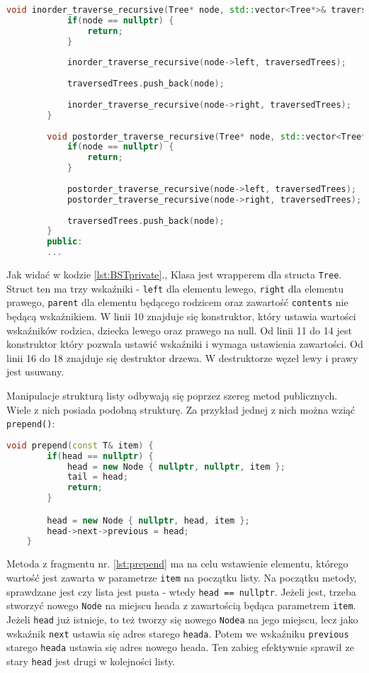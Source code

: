 \begin{lstlisting}[caption=Deklaracja drzewa BST, label={lst:BSTprivate}, language=C++]
		void inorder_traverse_recursive(Tree* node, std::vector<Tree*>& traversedTrees) {
			if(node == nullptr) {
				return;
			}
			
			inorder_traverse_recursive(node->left, traversedTrees);
			
			traversedTrees.push_back(node);
			
			inorder_traverse_recursive(node->right, traversedTrees);
		}
		
		void postorder_traverse_recursive(Tree* node, std::vector<Tree*>& traversedTrees) {
			if(node == nullptr) {
				return;
			}
			
			postorder_traverse_recursive(node->left, traversedTrees);
			postorder_traverse_recursive(node->right, traversedTrees);
			
			traversedTrees.push_back(node);
		}
		public:
		...
\end{lstlisting}

Jak widać w kodzie \ref{lst:BSTprivate}., Klasa jest wrapperem dla structa \texttt{Tree}. Struct ten ma trzy wskaźniki - \texttt{left} dla elementu lewego, \texttt{right} dla elementu prawego, \texttt{parent} dla elementu będącego rodzicem oraz zawartość \texttt{contents} nie będącą wskaźnikiem. W linii 10 znajduje się konstruktor, który ustawia wartości wskaźników rodzica, dziecka lewego oraz prawego na null.
Od linii 11 do 14 jest konstruktor który pozwala ustawić wskaźniki i wymaga ustawienia zawartości.
Od linii 16 do 18 znajduje się destruktor drzewa. W destruktorze węzeł lewy i prawy jest usuwany.

Manipulacje strukturą listy odbywają się poprzez szereg metod publicznych. Wiele z nich posiada podobną strukturę. Za przykład jednej z nich można wziąć \texttt{prepend()}:

\begin{lstlisting}[caption = Kod \texttt{prepend()}, label={lst:prepend}, language=C++]
	void prepend(const T& item) {
		if(head == nullptr) {
			head = new Node { nullptr, nullptr, item };	
			tail = head;
			return;
		}

		head = new Node { nullptr, head, item };
		head->next->previous = head;
	}
\end{lstlisting}

Metoda z fragmentu nr. \ref{lst:prepend} ma na celu wstawienie elementu, którego wartość jest zawarta w parametrze \texttt{item} na początku listy. Na początku metody, sprawdzane jest czy lista jest pusta - wtedy \texttt{head == nullptr}. Jeżeli jest, trzeba stworzyć nowego \texttt{Node} na miejscu heada z zawartością będąca parametrem \texttt{item}. Jeżeli \texttt{head} już istnieje, to też tworzy się nowego \texttt{Nodea} na jego miejscu, lecz jako wskaźnik \texttt{next} ustawia się adres starego \texttt{heada}. Potem we wskaźniku \texttt{previous} starego \texttt{heada} ustawia się adres nowego heada. Ten zabieg efektywnie sprawił ze stary \texttt{head} jest drugi w kolejności listy.

